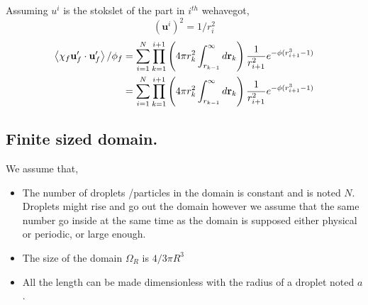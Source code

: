 Assuming $u^i$ is the stokslet of the part in $i^{th}$ wehavegot, 
\begin{equation}
    (\textbf{u}^i )^2
     = 1/r_i^2
\end{equation}
\begin{align}
    \left<\chi_f \textbf{u}_f'\cdot \textbf{u}_f'\right>/ \phi_f
    &=
    \sum_{i=1}^N 
    \prod_{k=1}^{i+1} \left(
        4\pi r_k^2
        \int_{r_{k-1}}^{\infty}
        d\textbf{r}_k 
    \right)
    \frac{1}{r_{i+1}^2}
    e^{-\phi(r_{i+1}^3- 1)}\\
    &=
    \sum_{i=1}^N 
    \prod_{k=1}^{i+1} \left(
        4\pi r_k^2
        \int_{r_{k-1}}^{\infty}
        d\textbf{r}_k 
    \right)
    \frac{1}{r_{i+1}^2}
    e^{-\phi(r_{i+1}^3- 1)}\\
\end{align}


\subsection{Finite sized domain. }


\begin{figure}[h!]
    \centering
\end{figure}
We assume that, 
\begin{itemize}
    \item The number of droplets /particles in the domain is constant and is noted $N$. 
    Droplets might rise and go out the domain however we assume that the same number go inside at the same time as the domain is supposed either physical or periodic, or large enough. 
    \item The size of the domain $\Omega_R$ is $4/3 \pi R^3$
    \item All the length can be made dimensionless with the radius of a droplet noted $a$.
\end{itemize}


